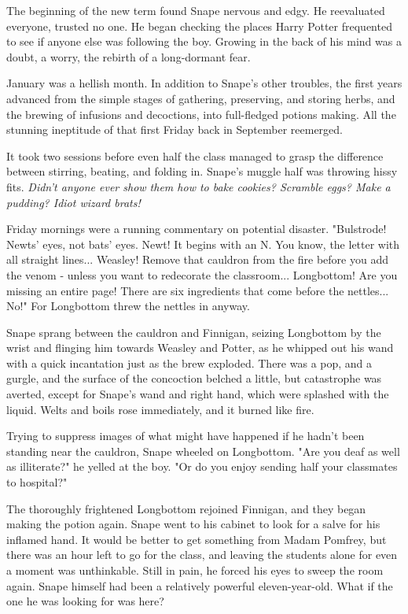 The beginning of the new term found Snape nervous and edgy. He reevaluated everyone, trusted no one. He began checking the places Harry Potter frequented to see if anyone else was following the boy. Growing in the back of his mind was a doubt, a worry, the rebirth of a long-dormant fear.

January was a hellish month. In addition to Snape's other troubles, the first years advanced from the simple stages of gathering, preserving, and storing herbs, and the brewing of infusions and decoctions, into full-fledged potions making. All the stunning ineptitude of that first Friday back in September reemerged.

It took two sessions before even half the class managed to grasp the difference between stirring, beating, and folding in. Snape's muggle half was throwing hissy fits. \emph{Didn't anyone ever show them how to bake cookies? Scramble eggs? Make a pudding? Idiot wizard brats!}

Friday mornings were a running commentary on potential disaster. "Bulstrode! Newts' eyes, not bats' eyes. Newt! It begins with an N. You know, the letter with all straight lines... Weasley! Remove that cauldron from the fire before you add the venom - unless you want to redecorate the classroom... Longbottom! Are you missing an entire page! There are six ingredients that come before the nettles... No!" For Longbottom threw the nettles in anyway.

Snape sprang between the cauldron and Finnigan, seizing Longbottom by the wrist and flinging him towards Weasley and Potter, as he whipped out his wand with a quick incantation just as the brew exploded. There was a pop, and a gurgle, and the surface of the concoction belched a little, but catastrophe was averted, except for Snape's wand and right hand, which were splashed with the liquid. Welts and boils rose immediately, and it burned like fire.

Trying to suppress images of what might have happened if he hadn't been standing near the cauldron, Snape wheeled on Longbottom. "Are you deaf as well as illiterate?" he yelled at the boy. "Or do you enjoy sending half your classmates to hospital?"

The thoroughly frightened Longbottom rejoined Finnigan, and they began making the potion again. Snape went to his cabinet to look for a salve for his inflamed hand. It would be better to get something from Madam Pomfrey, but there was an hour left to go for the class, and leaving the students alone for even a moment was unthinkable. Still in pain, he forced his eyes to sweep the room again. Snape himself had been a relatively powerful eleven-year-old. What if the one he was looking for was here?

